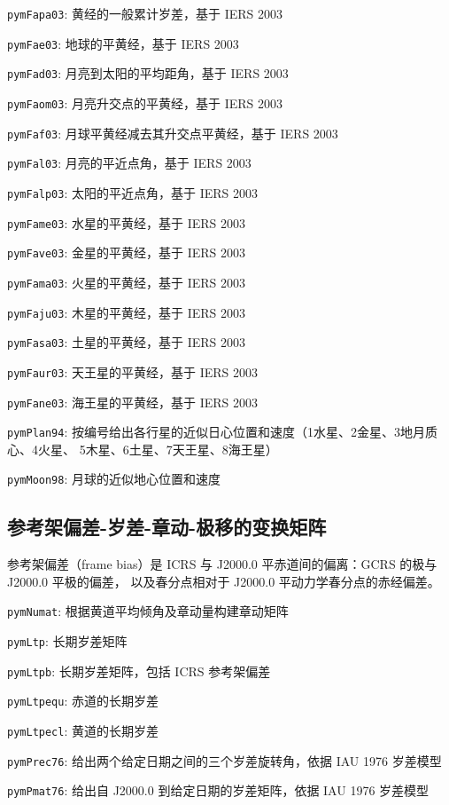 \documentclass[11pt]{article}
\begin{document}
\texttt{pymFapa03}: 黄经的一般累计岁差，基于 IERS 2003

\texttt{pymFae03}: 地球的平黄经，基于 IERS 2003

\texttt{pymFad03}: 月亮到太阳的平均距角，基于 IERS 2003

\texttt{pymFaom03}: 月亮升交点的平黄经，基于 IERS 2003

\texttt{pymFaf03}: 月球平黄经减去其升交点平黄经，基于 IERS 2003

\texttt{pymFal03}: 月亮的平近点角，基于 IERS 2003

\texttt{pymFalp03}: 太阳的平近点角，基于 IERS 2003

\texttt{pymFame03}: 水星的平黄经，基于 IERS 2003

\texttt{pymFave03}: 金星的平黄经，基于 IERS 2003

\texttt{pymFama03}: 火星的平黄经，基于 IERS 2003

\texttt{pymFaju03}: 木星的平黄经，基于 IERS 2003

\texttt{pymFasa03}: 土星的平黄经，基于 IERS 2003

\texttt{pymFaur03}: 天王星的平黄经，基于 IERS 2003

\texttt{pymFane03}: 海王星的平黄经，基于 IERS 2003

\texttt{pymPlan94}: 按编号给出各行星的近似日心位置和速度（1水星、2金星、3地月质心、4火星、
5木星、6土星、7天王星、8海王星）

\texttt{pymMoon98}: 月球的近似地心位置和速度

\subsection{参考架偏差-岁差-章动-极移的变换矩阵}
参考架偏差（frame bias）是 ICRS 与 J2000.0 平赤道间的偏离：GCRS 的极与 J2000.0 平极的偏差，
以及春分点相对于 J2000.0 平动力学春分点的赤经偏差。

\texttt{pymNumat}: 根据黄道平均倾角及章动量构建章动矩阵

\texttt{pymLtp}: 长期岁差矩阵

\texttt{pymLtpb}: 长期岁差矩阵，包括 ICRS 参考架偏差

\texttt{pymLtpequ}: 赤道的长期岁差

\texttt{pymLtpecl}: 黄道的长期岁差

\texttt{pymPrec76}: 给出两个给定日期之间的三个岁差旋转角，依据 IAU 1976 岁差模型

\texttt{pymPmat76}: 给出自 J2000.0 到给定日期的岁差矩阵，依据 IAU 1976 岁差模型
\end{document}
